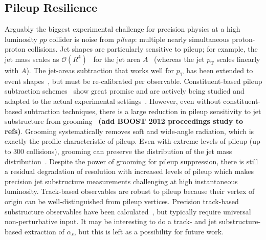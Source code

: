 %
%
%


\subsection{Pileup Resilience}

Arguably the biggest experimental challenge for precision physics at a high luminosity $pp$ collider is noise from \textit{pileup}: multiple nearly simultaneous proton-proton collisions.  Jet shapes are particularly sensitive to pileup; for example, the jet mass scales as $\mathcal{O}(R^4)$~\cite{Salam:2009jx} for the jet area $A$~\cite{Cacciari:2008gn} (whereas the jet $p_\text{T}$ scales linearly with $A$).  The jet-areas subtraction that works well for $p_\text{T}$ has been extended to event shapes~\cite{Soyez:2012hv}, but must be re-calibrated per observable.  Constituent-based pileup subtraction schemes~\cite{Cacciari:2014gra,Krohn:2013lba,Bertolini:2014bba,Berta:2014eza,Komiske:2017ubm} show great promise and are actively being studied and adapted to the actual experimental settings~\cite{CMS-PAS-JME-14-001,CMS-DP-2015-034,ATLAS-CONF-2017-065,ATL-PHYS-PUB-2017-020,Aad:2015ina}.  However, even without constituent-based subtraction techniques, there is a large reduction in pileup sensitivity to jet substructure from grooming~\cite{CMS-PAS-JME-14-001,Aad:2015rpa,Aad:2015ina} \textbf{(add BOOST 2012 proceedings study to refs)}.  Grooming systematically removes soft and wide-angle radiation, which is exactly the profile characteristic of pileup.   Even with extreme levels of pileup (up to 300 collisions), grooming can preserve the distribution of the jet mass distribution~\cite{JetSubstructureECFA2014}.   Despite the power of grooming for pileup suppression, there is still a residual degradation of resolution with increased levels of pileup which makes precision jet substructure measurements challenging at high instantaneous luminosity.  Track-based observables are robust to pileup because their vertex of origin can be well-distinguished from pileup vertices.  Precision track-based substructure observables have been calculated~\cite{Krohn:2012fg,Waalewijn:2012sv,Chang:2013rca,Elder:2017bkd}, but typically require universal non-perturbative input.  It may be interesting to do a track- and jet substructure-based extraction of $\alpha_s$, but this is left as a possibility for future work.

